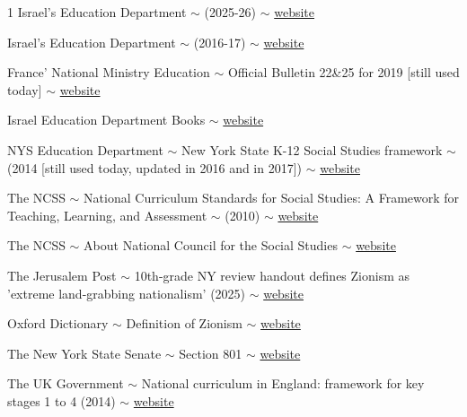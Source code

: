 \documentclass[12pt]{article}
\begin{document}
	\begin{thebibliography}{1}
		Israel's Education Department $\sim$ (2025-26) $\sim$ \href{https://meyda.education.gov.il/files/Curriculum/history_mm_10_12.pdf}{website}
		
		Israel's Education Department $\sim$ (2016-17) $\sim$ \href{https://meyda.education.gov.il/files/Mazkirut_Pedagogit/MikzootAzmaeem/historia_tachnit_hadasha.pdf}{website}
		
		France' National Ministry Education $\sim$ Official Bulletin 22\&25 for 2019 [still used today] $\sim$ \href{https://eduscol.education.fr/1667/programmes-et-ressources-en-histoire-geographie-voie-gt}{website} 
		
		Israel Education Department Books $\sim$ \href{https://meyda.education.gov.il/files/noar/70yeras2.pdf}{website}
		
		 NYS Education Department $\sim$ New York State K-12 Social Studies framework $\sim$ (2014 [still used today, updated in 2016 and in 2017]) $\sim$ \href{https://www.nysed.gov/standards-instruction/social-studies}{website}
		
		 The NCSS $\sim$ National Curriculum Standards for Social Studies: A Framework for Teaching, Learning, and Assessment $\sim$ (2010) $\sim$ \href{https://www.socialstudies.org/standards/national-curriculum-standards-social-studies}{website}
		
		 The NCSS $\sim$ About National Council for the Social Studies $\sim$ \href{https://www.socialstudies.org/about}{website}
		
		 The Jerusalem Post $\sim$ 10th-grade NY review handout defines Zionism as 'extreme land-grabbing nationalism' (2025) $\sim$ \href{https://www.jpost.com/diaspora/antisemitism/article-857234}{website}
		
		 Oxford Dictionary $\sim$ Definition of Zionism $\sim$ \href{https://www.oxfordlearnersdictionaries.com/definition/english/zionism}{website}
		
		 The New York State Senate $\sim$ Section 801 $\sim$ \href{https://www.nysenate.gov/legislation/laws/EDN/801}{website}
		
		 The UK Government $\sim$ National curriculum in England: framework for key stages 1 to 4 (2014) $\sim$ \href{https://www.gov.uk/government/publications/national-curriculum-in-england-framework-for-key-stages-1-to-4}{website}
		

\end{thebibliography}
\end{document}
